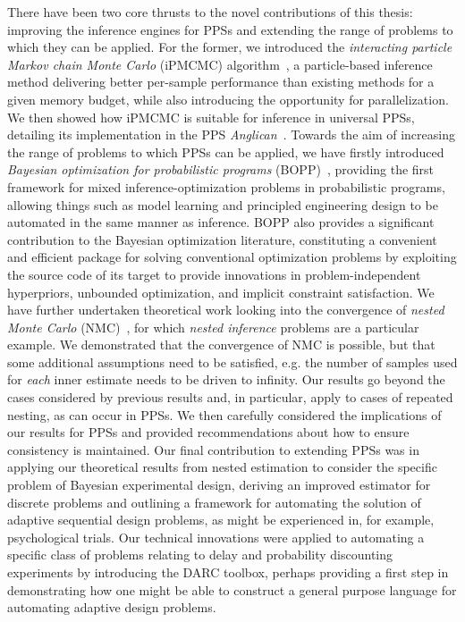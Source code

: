 There have been two core thrusts to the novel contributions of this thesis: improving the inference engines
for PPSs and extending the range of problems to which they can be applied.  For
the former, we introduced the \emph{interacting particle Markov chain Monte Carlo} (iPMCMC)
algorithm~\citep{rainforth2016interacting}, a particle-based inference method delivering
better per-sample performance than existing methods for a given memory budget, while also introducing the opportunity for
parallelization.  We then showed how iPMCMC is suitable for inference in universal PPSs, detailing its implementation
in the PPS \emph{Anglican}~\citep{tolpin2016design}.  Towards the aim of increasing the range of problems 
to which PPSs can be applied, 
we have firstly introduced \emph{Bayesian optimization for probabilistic 
	programs} (BOPP)~\citep{rainforth2016bayesian}, providing
the first framework for mixed inference-optimization problems in probabilistic programs, allowing things
such as model learning and principled engineering design to be automated in the same manner as inference.
BOPP also provides a significant contribution to the Bayesian optimization literature, constituting a
convenient and efficient package for solving conventional optimization problems by exploiting the
source code of its target to provide innovations in problem-independent hyperpriors, unbounded
 optimization, and implicit constraint satisfaction.
We have further undertaken theoretical work looking into the convergence of \emph{nested Monte Carlo} (NMC)~\citep{rainforth2017pitfalls}, for which \emph{nested inference} problems are a particular example.
We demonstrated that the convergence
of NMC is possible, but that some additional assumptions need
to be satisfied, e.g. the number of samples used for \emph{each} inner estimate needs to be driven
to infinity.  Our results go beyond the cases considered
by previous results and, in particular, apply to cases of repeated nesting, as can occur in PPSs.
We then carefully considered the implications of our results for PPSs and provided recommendations
about how to ensure consistency is maintained.  Our final contribution to extending PPSs was in
applying our theoretical results from nested estimation to consider the specific problem of Bayesian
experimental design, deriving an improved estimator for discrete problems and outlining a framework
for automating the solution of adaptive sequential design problems, as might be experienced in, for example,
psychological trials.  Our technical innovations were applied to automating
a specific class of problems relating to delay and probability discounting experiments by
introducing the DARC toolbox, perhaps providing a first step in demonstrating how one might
be able to construct a general purpose language for automating adaptive design problems.

